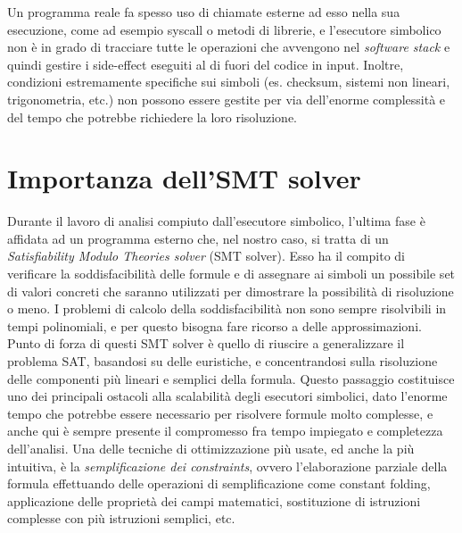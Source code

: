 \documentclass[Lau, oneside]{sapthesis}%
\begin{document}
\newline
Un programma reale fa spesso uso di chiamate esterne ad esso nella sua esecuzione, come ad esempio syscall o metodi di librerie, e l'esecutore simbolico non è in grado di tracciare tutte le operazioni che avvengono nel \textit{software stack} e quindi gestire i side-effect eseguiti al di fuori del codice in input.
\newline
Inoltre, condizioni estremamente specifiche sui simboli (es. checksum, sistemi non lineari, trigonometria, etc.)  non possono essere gestite per via dell'enorme complessità e del tempo che potrebbe richiedere la loro risoluzione.





\newpage
\section{Importanza dell'SMT solver}
Durante il lavoro di analisi compiuto dall'esecutore simbolico, l'ultima fase è affidata ad un programma esterno che, nel nostro caso, si tratta di un \textit{Satisfiability Modulo Theories solver} (SMT solver).
\newline
Esso ha il compito di verificare la soddisfacibilità delle formule e di assegnare ai simboli un possibile set di valori concreti che saranno utilizzati per dimostrare la possibilità di risoluzione o meno. 
\newline \newline
I problemi di calcolo della soddisfacibilità non sono sempre risolvibili in tempi polinomiali, e per questo bisogna fare ricorso a delle approssimazioni.
\newline
Punto di forza di questi SMT solver è quello di riuscire a generalizzare il problema SAT, basandosi su delle euristiche, e concentrandosi sulla risoluzione delle componenti più lineari e semplici della formula.
\newline \newline
Questo passaggio costituisce uno dei principali ostacoli alla scalabilità degli esecutori simbolici, dato l'enorme tempo che potrebbe essere necessario per risolvere formule molto complesse, e anche qui è sempre presente il compromesso fra tempo impiegato e completezza dell'analisi.
\newline \newline
Una delle tecniche di ottimizzazione più usate, ed anche la più intuitiva, è la \textit{semplificazione dei constraints}, ovvero l'elaborazione parziale della formula effettuando delle operazioni di semplificazione come constant folding, applicazione delle proprietà dei campi matematici, sostituzione di istruzioni complesse con più istruzioni semplici, etc.
\end{document}
